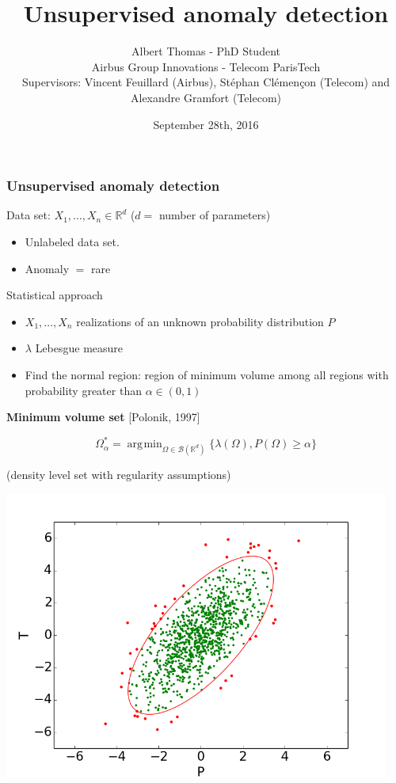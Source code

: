 \documentclass{beamer}
\title{Unsupervised anomaly detection}
\author{Albert Thomas - PhD Student\\
		Airbus Group Innovations - Telecom ParisTech \\
		\footnotesize Supervisors: Vincent Feuillard (Airbus), Stéphan Clémençon (Telecom) and Alexandre Gramfort (Telecom)
		}
\date{September 28th, 2016}
\DeclareMathOperator*{\argmin}{\arg\!\min}
\begin{document}
\begin{frame}\frametitle{Unsupervised anomaly detection}
Data set: $X_1, \dots, X_n \in \mathbb{R}^d$ ($d =$ number of parameters)
\begin{itemize}
	\item Unlabeled data set.
	\item Anomaly $=$ rare
\end{itemize}


Statistical approach
\begin{itemize}
	\item $X_1, \dots, X_n$ realizations of an unknown probability distribution $P$
	\item $\lambda$ Lebesgue measure
	\item Find the normal region: region of minimum volume among all regions with probability greater than $\alpha \in (0,1)$
\end{itemize}

\begin{minipage}{0.55\textwidth}
	\begin{center}
	\textbf{Minimum volume set} {\color{bleu}[Polonik, 1997]}
	\end{center}
	\begin{equation*}
	\Omega^*_{\alpha} = \argmin_{\Omega \in \mathcal{B}(\mathbb{R}^d)} \{\lambda(\Omega), P(\Omega) \geq \alpha \}
	\end{equation*}

	\begin{center}
	(density level set with regularity assumptions)
	\end{center}
\end{minipage}
\begin{minipage}{0.35\textwidth}
	\centering
	\includegraphics[width=0.95\textwidth]{img/anomaly_detection_end_col.png}
\end{minipage}


\end{frame}
\end{document}
